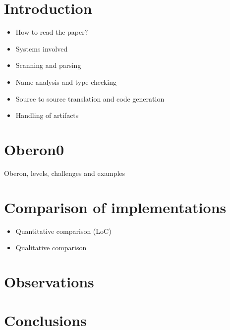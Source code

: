 \documentclass[english,preprint,12pt]{elsarticle}
\begin{document}

\section{Introduction}
\label{sec:intro}

\begin{itemize}
\item How to read the paper?
\item Systems involved
\item Scanning and parsing
\item Name analysis and type checking
\item Source to source translation and code generation
\item Handling of artifacts
\end{itemize}

\section{Oberon0}
\label{sec:oberon}
Oberon, levels, challenges and examples









\section{Comparison of implementations}
\label{sec:comparison}
\begin{itemize}
\item Quantitative comparison (LoC)
\item Qualitative comparison
\end{itemize}

\section{Observations}
\label{sec:observations}

\section{Conclusions}
\label{sec:conclusions}



\appendix
\end{document}
